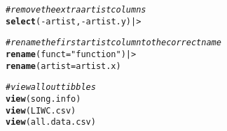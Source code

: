 \documentclass{article}\usepackage[]{graphicx}\usepackage[]{xcolor}
\makeatletter
\newcommand{\hlsng}[1]{\textcolor[rgb]{0.192,0.494,0.8}{#1}}%
\newcommand{\hlcom}[1]{\textcolor[rgb]{0.678,0.584,0.686}{\textit{#1}}}%
\newcommand{\hlopt}[1]{\textcolor[rgb]{0,0,0}{#1}}%
\newcommand{\hldef}[1]{\textcolor[rgb]{0.345,0.345,0.345}{#1}}%
\newcommand{\hlkwc}[1]{\textcolor[rgb]{0.333,0.667,0.333}{#1}}%
\newcommand{\hlkwd}[1]{\textcolor[rgb]{0.737,0.353,0.396}{\textbf{#1}}}%
\newenvironment{kframe}{%
 \def\at@end@of@kframe{}%
 \ifinner\ifhmode%
  \def\at@end@of@kframe{\end{minipage}}%
  \begin{minipage}{\columnwidth}%
 \fi\fi%
 \def\FrameCommand##1{\hskip\@totalleftmargin \hskip-\fboxsep
 \colorbox{shadecolor}{##1}\hskip-\fboxsep
     \hskip-\linewidth \hskip-\@totalleftmargin \hskip\columnwidth}%
 \MakeFramed {\advance\hsize-\width
   \@totalleftmargin\z@ \linewidth\hsize
   \@setminipage}}%
 {\par\unskip\endMakeFramed%
 \at@end@of@kframe}
\newenvironment{knitrout}{}{} %
\makeatother
\begin{document}
\begin{enumerate}
\begin{knitrout}
\begin{kframe}
\begin{alltt}
  \hlcom{#remove the extra artist columns}
  \hlkwd{select}\hldef{(}\hlopt{-}\hldef{artist,} \hlopt{-}\hldef{artist.y) |>}

  \hlcom{#rename the first artist column to the correct name}
  \hlkwd{rename}\hldef{(}\hlkwc{funct} \hldef{=} \hlsng{"function"}\hldef{) |>}
  \hlkwd{rename}\hldef{(}\hlkwc{artist} \hldef{= artist.x)}



\hlcom{#view all out tibbles}
\hlkwd{view}\hldef{(song.info)}
\hlkwd{view}\hldef{(LIWC.csv)}
\hlkwd{view}\hldef{(all.data.csv)}
\end{alltt}
\end{kframe}
\end{knitrout}
\end{enumerate}

\end{document}
